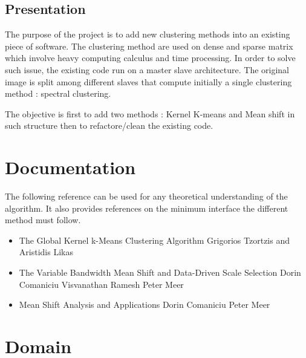 \documentclass[12pt]{article} %
\begin{document}
\subsection{Presentation}
The purpose of the project is to add new clustering methods into an existing piece of software. The clustering method are used on dense and sparse matrix which involve heavy computing calculus and time processing. In order to solve such issue, the existing code run on a master slave architecture. The original image is split among different slaves that compute initially a single clustering method : spectral clustering. 
\begin{figure}[H] %
\caption{}
\label{fig:speciation}
\end{figure}
The objective is first to add two methods : Kernel K-means and Mean shift in such structure then to refactore/clean the existing code.


\section{Documentation}
The following reference can be used for any theoretical understanding of the algorithm. It also provides references on the minimum interface the different method must follow.

\begin{itemize}
\item The Global Kernel k-Means Clustering Algorithm
Grigorios Tzortzis and Aristidis Likas
\item The Variable Bandwidth Mean Shift and Data-Driven Scale Selection
Dorin Comaniciu
Visvanathan Ramesh 
Peter Meer
\item Mean Shift Analysis and Applications
Dorin Comaniciu
Peter Meer

\end{itemize}

\section{Domain}
\end{document}
